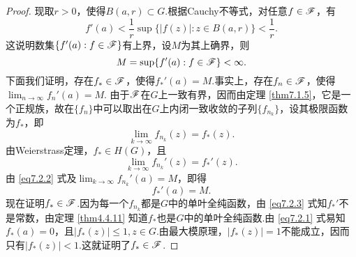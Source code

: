 \begin{proof}
现取$r>0$，使得$B(a,r)\subset G$.根据Cauchy不等式，对任意$f\in \mathscr F$，有
\[f'(a)<\frac1r\sup\{|f(z)|:z\in B(a,r)\}<\frac1r.\]
这说明数集$\{f'(a):f\in\mathscr F\}$有上界，设$M$为其上确界，则
\[M=\sup\{f'(a):f\in\mathscr F\}<\infty.\]
下面我们证明，存在$f_\ast\in \mathscr F$，使得$f_\ast'(a)=M$.事实上，存在$f_n\in\mathscr F$，使得$\lim_{n\to\infty}f_n'(a)=M $. 由于$\mathscr F$在$G$上一致有界，因而由定理 \ref{thm7.1.5}，它是一个正规族，故在$\{f_n\}$中可以取出在$G$上内闭一致收敛的子列$\{f_{n_k}\}$，设其极限函数为$f_\ast$，即
\begin{equation}\label{eq7.2.1}
\lim_{k\to\infty}f_{n_k}(z)=f_\ast(z).
\end{equation}
由Weierstrass定理，$f_\ast\in H(G)$，且
\begin{equation}\label{eq7.2.2}
\lim_{k\to\infty} f_{n_k}'(z)=f_\ast'(z).
\end{equation}
由 \eqref{eq7.2.2} 式及$\lim_{k\to\infty}f_{n_k}'(a)=M$，即得
\begin{equation}\label{eq7.2.3}
f_\ast'(a)=M.
\end{equation}
现在证明$f_\ast\in\mathscr F$.因为每一个$f_{n_k}$都是$G$中的单叶全纯函数，由 \eqref{eq7.2.3} 式知$f_\ast'$不是常数，由定理 \ref{thm4.4.11} 知道$f_\ast$也是$G$中的单叶全纯函数.由 \eqref{eq7.2.1} 式易知$f_\ast(a)=0$，且$|f_\ast(z)|\le1,z\in G$.由最大模原理，$|f_\ast(z)|=1$不能成立，因而只有$|f_\ast(z)|<1$.这就证明了$f_\ast\in\mathscr F$.


\end{proof}
